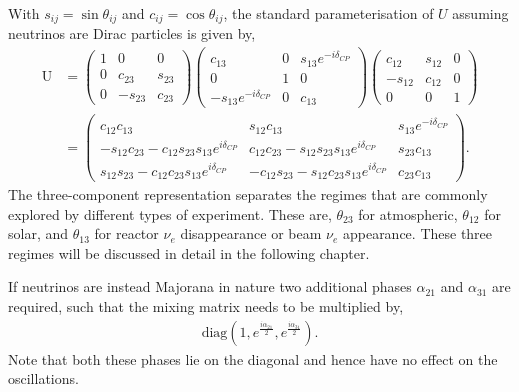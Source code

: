 With $s_{ij}=\sin \theta_{ij}$ and $c_{ij}=\cos \theta_{ij}$, the standard parameterisation of
$U$ assuming neutrinos are Dirac particles is given by,
\begin{align} %
    \mathrm{U} & =
    \begin{pmatrix}
        1 & 0       & 0      \\
        0 & c_{23}  & s_{23} \\
        0 & -s_{23} & c_{23}
    \end{pmatrix}
    \begin{pmatrix}
        c_{13}                   & 0 & s_{13}e^{-i\delta_{CP}} \\
        0                        & 1 & 0                       \\
        -s_{13}e^{-i\delta_{CP}} & 0 & c_{13}
    \end{pmatrix}
    \begin{pmatrix}
        c_{12}  & s_{12} & 0 \\
        -s_{12} & c_{12} & 0 \\
        0       & 0      & 1
    \end{pmatrix}
    \\
               & =
    \begin{pmatrix}
        c_{12}c_{13}
         & s_{12}c_{13}
         & s_{13}e^{-i\delta_{CP}}                          \\
        -s_{12}c_{23}-c_{12}s_{23}s_{13}e^{i\delta_{CP}}
         & c_{12}c_{23}-s_{12}s_{23}s_{13}e^{i\delta_{CP}}
         & s_{23}c_{13}                                     \\
        s_{12}s_{23}-c_{12}c_{23}s_{13}e^{i\delta_{CP}}
         & -c_{12}s_{23}-s_{12}c_{23}s_{13}e^{i\delta_{CP}}
         & c_{23}c_{13}
    \end{pmatrix}.
\end{align} %
The three-component representation separates the regimes that are commonly explored by different
types of experiment. These are, $\theta_{23}$ for atmospheric, $\theta_{12}$ for solar, and
$\theta_{13}$ for reactor $\nu_{e}$ disappearance or beam $\nu_{e}$ appearance. These three
regimes will be discussed in detail in the following chapter.

If neutrinos are instead Majorana in nature two additional phases $\alpha_{21}$ and $\alpha_{31}$
are required, such that the mixing matrix needs to be multiplied by,
\begin{align} %
    \mathrm{diag}(1, e^{\frac{i\alpha_{21}}{2}}, e^{\frac{i\alpha_{31}}{2}}).
\end{align} %
Note that both these phases lie on the diagonal and hence have no effect on the oscillations.

